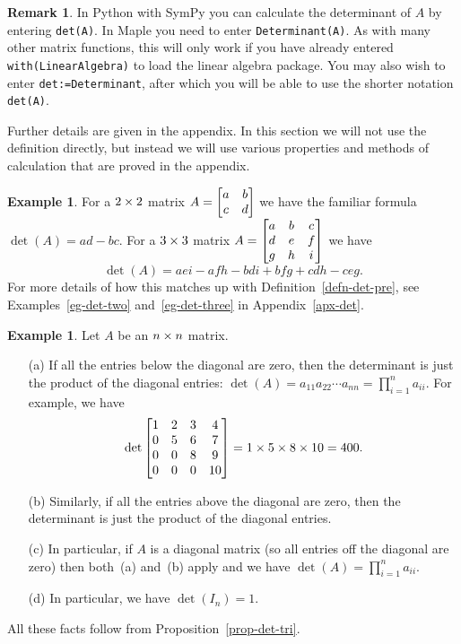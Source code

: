 \documentclass[reqno]{amsart}
\theoremstyle{definition}
\newtheorem{remark}[theorem]{Remark}
\newtheorem{example}[theorem]{Example}
\begin{document}
\begin{remark}
 In Python with SymPy you can calculate the determinant of $A$ by
 entering \verb|det(A)|.  In Maple you need to enter 
 \verb+Determinant(A)+.  As with many other matrix functions, this
 will only work if you have already entered \verb+with(LinearAlgebra)+
 to load the linear algebra package.  You may also wish to enter
 \verb+det:=Determinant+, after which you will be able to use the
 shorter notation \verb+det(A)+.  
\end{remark}

Further details are given in the appendix.  In this section we will
not use the definition directly, but instead we will use various
properties and methods of calculation that are proved in the
appendix.

\begin{example}\label{eg-det-small}
 For a $2\times 2$ matrix $A=\left[\begin{matrix} a&b\\c&d\end{matrix}\right]$ we have the familiar
 formula $\det(A)=ad-bc$.  For a $3\times 3$ matrix
 $A=\left[\begin{matrix} a&b&c\\ d&e&f\\ g&h&i\end{matrix}\right]$ we have
 \[ \det(A) = aei - afh - bdi + bfg + cdh - ceg. \]
 For more details of how this matches up with
 Definition~\ref{defn-det-pre}, see Examples~\ref{eg-det-two}
 and~\ref{eg-det-three} in Appendix~\ref{apx-det}.
\end{example}

\begin{example}\label{eg-det-tri}
 Let $A$ be an $n\times n$ matrix.
 \begin{itemize}
  \item[(a)] If all the entries below the diagonal are zero, then the
   determinant is just the product of the diagonal entries:
   $\det(A)=a_{11}a_{22}\dotsb a_{nn}=\prod_{i=1}^na_{ii}$.  For
   example, we have
   \[ \det\left[\begin{matrix} 1&2&3&4 \\ 0&5&6&7 \\ 0&0&8&9 \\ 0&0&0&10\end{matrix}\right] =
       1 \times 5 \times 8 \times 10 = 400.
   \]
  \item[(b)] Similarly, if all the entries above the diagonal are
   zero, then the determinant is just the product of the diagonal
   entries.
  \item[(c)] In particular, if $A$ is a diagonal matrix (so all
   entries off the diagonal are zero) then both~(a) and~(b) apply and
   we have $\det(A)=\prod_{i=1}^na_{ii}$.
  \item[(d)] In particular, we have $\det(I_n)=1$.
 \end{itemize}
 All these facts follow from Proposition~\ref{prop-det-tri}.
\end{example}
\end{document}
